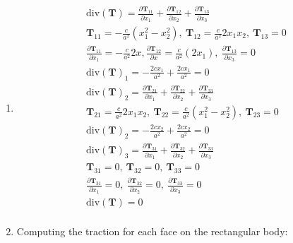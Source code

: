 \begin{problem}
    \noindent
    \normalfont

    \begin{enumerate}
        \item 
        \begin{align}
        \text{div}(\mathbf{T})=\frac{ \partial \mathbf{T}_{11} }{ \partial x_{1} }+ \frac{ \partial \mathbf{T}_{12} }{ \partial x_{2} }+\frac{ \partial \mathbf{T}_{13} }{ \partial x_{3} } \\
        \mathbf{T}_{11}=-\frac{c}{a^2}(x_{1}^2-x_{2}^2),\ \mathbf{T}_{12}=\frac{c}{a^2}2x_{1}x_{2},\ \mathbf{T}_{13}=0 \\
        \frac{ \partial \mathbf{T}_{11} }{ \partial x_{1} } =-\frac{c}{a^2}2x,\frac{ \partial \mathbf{T}_{12} }{ \partial x } =\frac{c}{a^2}(2x_{1}),\ \frac{ \partial \mathbf{T}_{13} }{ \partial x_{3} } =0 \\
        \text{div}(\mathbf{T})_{1}=-\frac{2cx_{1}}{a^2}+\frac{2cx_{1}}{a^2} =0\\
        \text{div}(\mathbf{T})_{2}=\frac{ \partial \mathbf{T}_{21} }{ \partial x_{1} } +\frac{ \partial \mathbf{T}_{22} }{ \partial x_{2} } +\frac{ \partial \mathbf{T}_{23} }{ \partial x_{3} }  \\
        \mathbf{T}_{21}=\frac{c}{a^2}2x_{1}x_{2},\ \mathbf{T}_{22}=\frac{c}{a^2}(x_{1}^2-x_{2}^2),\ \mathbf{T}_{23}=0 \\
        \text{div}(\mathbf{T})_{2}=-\frac{2cx_{2}}{a^2}+\frac{2cx_{2}}{a^2} =0\\
        \text{div}(\mathbf{T})_{3}=\frac{ \partial \mathbf{T}_{31} }{ \partial x_{1} } +\frac{ \partial \mathbf{T}_{32} }{ \partial x_{2} }+\frac{ \partial \mathbf{T}_{33} }{ \partial x_{3} } \\
        \mathbf{T}_{31}=0,\ \mathbf{T}_{32}=0, \ \mathbf{T}_{33}=0 \\
        \frac{ \partial \mathbf{T}_{31} }{ \partial x_{1} }=0,\ \frac{ \partial \mathbf{T}_{32} }{ \partial x_{2} }  =0,\ \frac{ \partial \mathbf{T}_{33} }{ \partial x_{3} } =0 \\
        \text{div}(\mathbf{T})=0 \\
        \end{align}
        \item Computing the traction for each face on the rectangular body:
        

\end{enumerate}
\end{problem}
